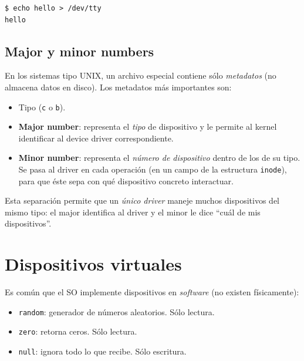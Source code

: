 \documentclass[11pt,a4paper]{article}
\begin{document}
\begin{lstlisting}[style=shellstyle]
$ echo hello > /dev/tty
hello
\end{lstlisting}

\subsection{Major y minor numbers}

En los sistemas tipo UNIX, un archivo especial contiene sólo
\emph{metadatos} (no almacena datos en disco). Los metadatos más
importantes son:

\begin{itemize}[leftmargin=*]
    \item Tipo (\texttt{c} o \texttt{b}).
    \item \textbf{Major number}: representa el \emph{tipo} de
        dispositivo y le permite al kernel identificar al device
        driver correspondiente.
    \item \textbf{Minor number}: representa el \emph{número de
        dispositivo} dentro de los de su tipo. Se pasa al driver en
        cada operación (en un campo de la estructura \texttt{inode}),
        para que éste sepa con qué dispositivo concreto interactuar.
\end{itemize}

\begin{idea}
Esta separación permite que un \emph{único driver} maneje muchos
dispositivos del mismo tipo: el major identifica al driver y el minor
le dice ``cuál de mis dispositivos''.
\end{idea}

\section{Dispositivos virtuales}

Es común que el SO implemente dispositivos en \emph{software} (no
existen físicamente):

\begin{itemize}[leftmargin=*]
    \item \texttt{random}: generador de números aleatorios. Sólo
        lectura.
    \item \texttt{zero}: retorna ceros. Sólo lectura.
    \item \texttt{null}: ignora todo lo que recibe. Sólo escritura.
\end{itemize}
\end{document}

